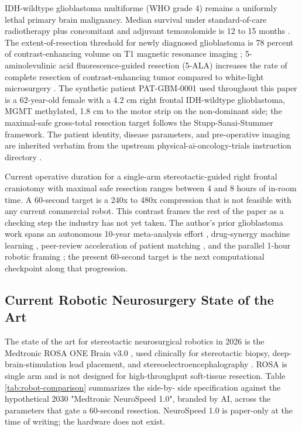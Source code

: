 IDH-wildtype glioblastoma multiforme (WHO grade 4) remains a uniformly
lethal primary brain malignancy. Median survival under standard-of-care
radiotherapy plus concomitant and adjuvant temozolomide is 12 to 15
months \cite{Stupp2005Glioblastoma}. The extent-of-resection threshold
for newly diagnosed glioblastoma is 78 percent of contrast-enhancing
volume on T1 magnetic resonance imaging \cite{Sanai2011GBMResection};
5-aminolevulinic acid fluorescence-guided resection (5-ALA) increases
the rate of complete resection of contrast-enhancing tumor compared
to white-light microsurgery \cite{Stummer20055ALA}. The synthetic
patient PAT-GBM-0001 used throughout this paper is a 62-year-old
female with a 4.2 cm right frontal IDH-wildtype glioblastoma, MGMT
methylated, 1.8 cm to the motor strip on the non-dominant side; the
maximal-safe gross-total resection target follows the
Stupp-Sanai-Stummer framework. The patient identity, disease
parameters, and pre-operative imaging are inherited verbatim from the
upstream physical-ai-oncology-trials instruction directory
\cite{one-minute-variant-instructions}.

Current operative duration for a single-arm stereotactic-guided right
frontal craniotomy with maximal safe resection ranges between 4 and
8 hours of in-room time. A 60-second target is a 240x to 480x
compression that is not feasible with any current commercial robot.
This contrast frames the rest of the paper as a checking step the
industry has not yet taken. The author's prior glioblastoma work
spans an autonomous 10-year meta-analysis effort
\cite{kawchak_2025_15549831}, drug-synergy machine learning
\cite{kawchak_2025_17614396}, peer-review acceleration of patient
matching \cite{kawchak_2025_17774560}, and the parallel 1-hour
robotic framing \cite{kawchak_2026_19994945}; the present 60-second
target is the next computational checkpoint along that progression.

\subsection{Current Robotic Neurosurgery State of the Art}
\label{sec:intro-baseline}

The state of the art for stereotactic neurosurgical robotics in 2026
is the Medtronic ROSA ONE Brain v3.0 \cite{rosa-one-brain}, used
clinically for stereotactic biopsy, deep-brain-stimulation lead
placement, and stereoelectroencephalography
\cite{Lefranc2014ROSAStereotaxy, Kalakoti2019RoboticsReview}. ROSA is
single arm and is not designed for high-throughput soft-tissue
resection. Table \ref{tab:robot-comparison} summarizes the side-by-
side specification against the hypothetical 2030 "Medtronic NeuroSpeed
1.0", branded by AI, across the parameters that gate a 60-second resection. NeuroSpeed
1.0 is paper-only at the time of writing; the hardware does not exist.

